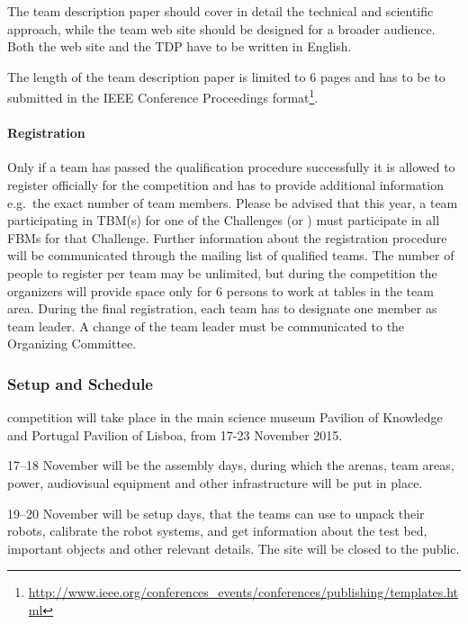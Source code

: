 %
The team description paper should cover in detail the technical and scientific approach, while the team web site should be designed for a broader audience. Both the web site and the TDP have to be written in English.

The length of the team description paper is limited to 6 pages and has to be to submitted in the IEEE Conference Proceedings format\footnote{\url{http://www.ieee.org/conferences_events/conferences/publishing/templates.html}}.


\paragraph{Registration}
\label{par:CompRegistration}

Only if a team has passed the qualification procedure successfully it is allowed to register officially for the competition and has to provide additional information e.g.~the exact number of team members.
Please be advised that this year, a team participating in TBM(s) for one of the Challenges (\roah or \roaw) must participate in all FBMs for that Challenge.
Further information about the registration procedure will be communicated through the mailing list of qualified teams.
The number of people to register per team may be unlimited, but during the competition the organizers will provide space only for 6 persons to work at tables in the team area. 
During the final registration, each team has to designate one member as team leader.  A change of the team leader must be communicated to the Organizing Committee. 

\subsubsection{Setup and Schedule}
\label{sssec:CompSetupSchedule}

\erlir competition will take place in the main science museum Pavilion of Knowledge and Portugal Pavilion of Lisboa, from 17-23 November 2015.

17--18 November will be the assembly days, during which the arenas, team areas, power, audiovisual equipment and other infrastructure will be put in place.

19--20 November will be setup days, that the teams can use to unpack their robots, calibrate the robot systems, and get information about the test bed, important objects and other relevant details. The site will be closed to the public.

